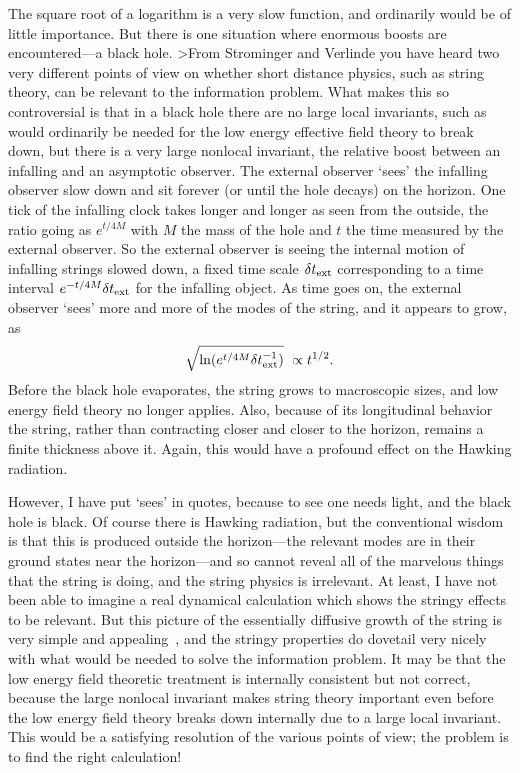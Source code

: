 The square root of a logarithm is a very slow function, and
ordinarily would be of little importance.  But there is one
situation where enormous boosts are encountered---a black hole.
>From Strominger and Verlinde you have heard two very different
points of view on whether short distance physics, such as string
theory, can be relevant to the information problem.  What makes this
so controversial is that in a black hole there are no large local
invariants, such as would ordinarily be needed for the low energy
effective field theory to break down, but there is a very large
nonlocal invariant, the relative boost between an infalling and an
asymptotic observer.  The external observer `sees' the infalling
observer slow down and sit forever (or until the hole decays) on the
horizon.  One tick of the infalling clock takes longer and longer as
seen from the outside, the ratio going as $e^{t/4M}$ with $M$ the
mass of the hole and $t$ the time measured by the external observer. 
So the external observer is seeing the internal motion of infalling
strings slowed down, a fixed time scale $\delta t_{\rm ext}$ 
corresponding to a time interval $e^{-t/4M}\delta t_{\rm ext}$
for the infalling object.  As time goes on, the external observer
`sees' more and more of the modes of the string, and it appears to
grow, as
\begin{equation}
\sqrt {\ln(e^{t/4M}\delta t_{\rm ext}^{-1}) }\ \propto
t^{1/2}.
\end{equation}
Before the black hole evaporates, the string grows to macroscopic
sizes, and low energy field theory no longer applies.
Also, because of its longitudinal behavior
the string, rather than contracting closer and closer to the
horizon, remains a finite thickness above it.  Again, this would have a
profound effect on the Hawking radiation.

However, I have put `sees' in quotes, because to see one needs
light, and the black hole is black.  Of course there is Hawking
radiation, but the conventional wisdom is that this is produced 
outside the horizon---the relevant modes are in their ground states
near the horizon---and so cannot reveal all of the marvelous things
that the string is doing, and the string physics is irrelevant.
At least, I have not been able to imagine a real dynamical
calculation which shows the stringy effects to be relevant.  But
this picture of the essentially diffusive growth of the string is
very simple and appealing~\cite{MPT}, and the stringy properties do
dovetail very nicely with what would be needed to solve the
information problem.  It may be that the low energy field theoretic
treatment is internally consistent but not correct, because the
large nonlocal invariant makes string theory important even before
the low energy field theory breaks down internally due to a large
local invariant. This would be a satisfying resolution of the
various points of view; the problem is to find the right calculation!

